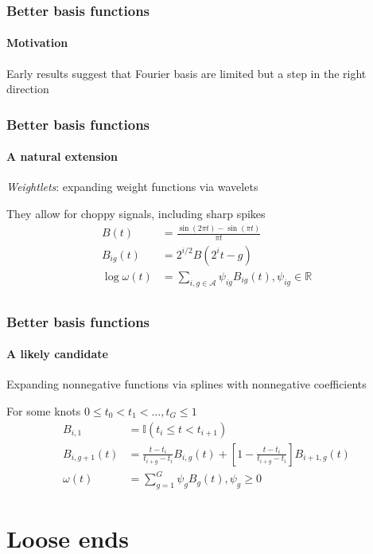 \documentclass[handout]{snedecorbeamer}
\begin{document}
\begin{frame}
  \frametitle{Better basis functions}
  \framesubtitle{Motivation}

  Early results suggest that Fourier basis are limited but
  a step in the right direction
\end{frame}

\begin{frame}
  \frametitle{Better basis functions}
  \framesubtitle{A natural extension}

  \emph{Weightlets}: expanding weight functions via wavelets

  They allow for choppy signals, including sharp spikes
  \begin{align}
    B(t)
    &={\frac {\sin(2\pi t)-\sin(\pi t)}{\pi t}} \\
    B_{ig}(t)
    &= 2^{i/2} B(2^i t - g) \\
    \log\omega(t)
    &= \sum_{i,g\in\mathcal{A}} \psi_{ig} B_{ig}(t),\psi_{ig}\in\mathbb{R} \\
  \end{align}
\end{frame}

\begin{frame}
  \frametitle{Better basis functions}
  \framesubtitle{A likely candidate}

  Expanding nonnegative functions via splines with nonnegative
  coefficients\cite{deboor1974}

  For some knots $0 \le t_0 < t_1 < \dots, t_G \le 1$
  \begin{align}
    B_{i, 1}
    &= \mathbb{I}(t_i \le t < t_{i+1}) \\
    B_{i, g+1}(t)
    &=\frac{t - t_i}{t_{i+g} - t_i} B_{i, g}(t)
      + \left[1 - \frac{t - t_i}{t_{i+g} - t_i}\right] B_{i + 1, g}(t) \\
    \omega(t)
    &=\sum_{g=1}^{G}\psi_{g}B_g(t), \psi_{g}\ge0
  \end{align}
\end{frame}

\section{Loose ends}
\end{document}
